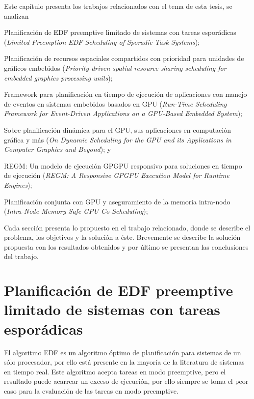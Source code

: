 
Este capítulo presenta los trabajos relacionados con el tema de esta tesis, se analizan 
\begin{inparaenum}
	\item Planificación de EDF preemptive limitado de sistemas con tareas esporádicas
	 (\textit{Limited Preemption EDF Scheduling of Sporadic Task Systems});
	 \item Planificación de recursos espaciales compartidos con prioridad para unidades de gráficos embebidos 
	 (\textit{Priority-driven spatial resource sharing scheduling for embedded graphics processing units});
	\item Framework para planificación en tiempo de ejecución de aplicaciones con manejo de eventos en sistemas embebidos basados en GPU 
	(\textit{Run-Time Scheduling Framework for Event-Driven Applications on a GPU-Based Embedded System});
	\item Sobre planificación dinámica para el GPU, sus aplicaciones en computación gráfica y más
	(\textit{On Dynamic Scheduling for the GPU and its Applications in Computer Graphics and Beyond}); y
	\item REGM: Un modelo de ejecución GPGPU responsivo para soluciones en tiempo de ejecución
	(\textit{REGM: A Responsive GPGPU Execution Model for Runtime Engines});
    	\item Planificación conjunta con GPU y aseguramiento de la memoria intra-nodo 
	(\textit{Intra-Node Memory Safe GPU Co-Scheduling});
 \end{inparaenum}

\vspace{0.3cm}
Cada sección presenta lo propuesto en el trabajo relacionado, donde se describe el problema, los objetivos y la solución a éste. Brevemente se describe la solución propuesta con los resultados obtenidos y por último se presentan las conclusiones del trabajo.

\section{Planificación de EDF preemptive limitado de sistemas con tareas esporádicas}

El algoritmo EDF es un algoritmo óptimo de planificación para sistemas de un sólo procesador, por ello está presente en la mayoría de la literatura de sistemas en tiempo real. Este algoritmo acepta tareas en modo preemptive, pero el resultado puede acarrear un exceso de ejecución, por ello siempre se toma el peor caso para la evaluación de las tareas en modo preemptive.

